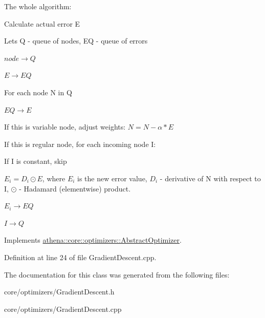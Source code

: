 The whole algorithm\+: 
\begin{DoxyEnumerate}
\item Calculate actual error E  
\item Let\textquotesingle{}s Q -\/ queue of nodes, EQ -\/ queue of errors 
\begin{DoxyEnumerate}
\item $ node \rightarrow Q $  
\item $ E \rightarrow EQ $  
\end{DoxyEnumerate}
\item For each node N in Q 
\begin{DoxyEnumerate}
\item $ EQ \rightarrow E $  
\item If this is variable node, adjust weights\+: $ N = N - \alpha * E $  
\item If this is regular node, for each incoming node I\+: 
\begin{DoxyEnumerate}
\item If I is constant, skip  
\item $ E_i = D_i \odot E $, where $ E_i $ is the new error value, $ D_i $ -\/ derivative of N with respect to I, $ \odot $ -\/ Hadamard (elementwise) product.  
\item $ E_i \rightarrow EQ $  
\item $ I \rightarrow Q $  
\end{DoxyEnumerate}
\end{DoxyEnumerate}
\end{DoxyEnumerate}

Implements \mbox{\hyperlink{classathena_1_1core_1_1optimizers_1_1_abstract_optimizer}{athena\+::core\+::optimizers\+::\+Abstract\+Optimizer}}.



Definition at line 24 of file Gradient\+Descent.\+cpp.



The documentation for this class was generated from the following files\+:\begin{DoxyCompactItemize}
\item 
core/optimizers/Gradient\+Descent.\+h\item 
core/optimizers/Gradient\+Descent.\+cpp\end{DoxyCompactItemize}

